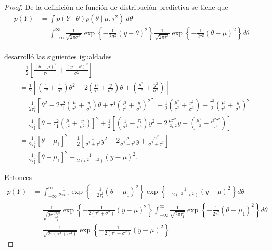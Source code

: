     \begin{proof}
    De la definici\'on de funci\'on de distribuci\'on predictiva se tiene que
    \begin{align*}
    p(Y)&=\int p(Y \mid \theta)p(\theta \mid \mu,\tau^2)\ d\theta\\
    &=\int_{-\infty}^{\infty} \frac{1}{\sqrt{2\pi\sigma^2}}\exp\left\{-\frac{1}{2\sigma^2}(y-\theta)^2\right\}
    \frac{1}{\sqrt{2\pi\tau^2}}\exp\left\{-\frac{1}{2\tau^2}(\theta-\mu)^2\right\}d\theta\\
    \end{align*}
    
     desarroll\'o las siguientes igualdades
    \begin{align*}
    &\ \ \ \ \frac{1}{2}\left[\frac{(\theta-\mu)^2}{\tau^2}+\frac{(y-\theta)^2}{\sigma^2}\right]\\
    &=\frac{1}{2}\left[\left(\frac{1}{\tau^2}+\frac{1}{\sigma^2}\right)\theta^2-2\left(\frac{\mu}{\tau^2}+\frac{y}{\sigma^2}\right)\theta+\left(\frac{\mu^2}{\tau^2}+\frac{y^2}{\sigma^2}\right)\right]\\
    &=\frac{1}{2\tau_1^2}\left[\theta^2-2\tau_1^2\left(\frac{\mu}{\tau^2}+\frac{y}{\sigma^2}\right)\theta+\tau_1^4\left(\frac{\mu}{\tau^2}+\frac{y}{\sigma^2}\right)^2\right]+\frac{1}{2}\left(\frac{\mu^2}{\tau^2}+\frac{y^2}{\sigma^2}\right)-\frac{\tau_1^2}{2}\left(\frac{\mu}{\tau^2}+\frac{y}{\sigma^2}\right)^2\\
    &=\frac{1}{2\tau_1^2}\left[\theta-\tau_1^2\left(\frac{\mu}{\tau^2}+\frac{y}{\sigma^2}\right)\right]^2+\frac{1}{2}\left[\left(\frac{1}{\sigma^2}-\frac{\tau_1^2}{\sigma^4}\right)y^2-2\frac{\mu\tau_1^2}{\tau^2\sigma^2}y+\left(\frac{\mu^2}{\tau^2}-\frac{\mu^2\tau_1^2}{\tau^4}\right)\right]\\
    &=\frac{1}{2\tau_1^2}\left[\theta-\mu_1\right]^2+\frac{1}{2}\left[\frac{1}{\sigma^2+\tau^2}y^2-2\frac{\mu}{\sigma^2+\tau^2}y+\frac{\mu^2}{\sigma^2+\tau^2}\right]\\
    &=\frac{1}{2\tau_1^2}\left[\theta-\mu_1\right]^2+\frac{1}{2(\sigma^2+\tau^2)}(y-\mu)^2.
    \end{align*}
    
    
    Entonces
    \begin{align*}
    p(Y)&=\int_{-\infty}^{\infty} \frac{1}{2\pi\sigma\tau}\exp\left\{-\frac{1}{2\tau_1^2}(\theta-\mu_1)^2\right\}
    \exp\left\{-\frac{1}{2(\tau^2+\sigma^2)}(y-\mu)^2\right\}d\theta\\
    &= \frac{1}{\sqrt{2\pi\frac{\sigma^2\tau^2}{\tau_1^2}}}\exp\left\{-\frac{1}{2(\tau^2+\sigma^2)}(y-\mu)^2\right\}
    \int_{-\infty}^{\infty} \frac{1}{\sqrt{2\pi\tau_1^2}}\exp\left\{-\frac{1}{2\tau_1^2}(\theta-\mu_1)^2\right\}d\theta\\
    &= \frac{1}{\sqrt{2\pi(\tau^2+\sigma^2)}}\exp\left\{-\frac{1}{2(\tau^2+\sigma^2)}(y-\mu)^2\right\}
    \end{align*}
    \end{proof}
    
